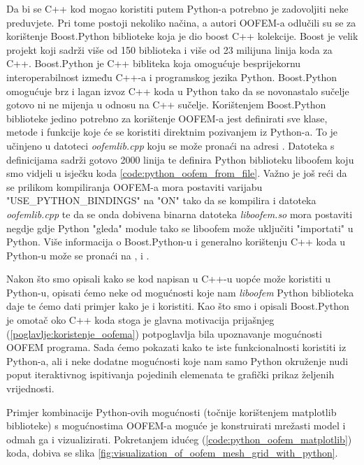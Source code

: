 \documentclass[a4paper,twoside,12pt]{memoir} %
\begin{document}
Da bi se C++ kod mogao koristiti putem Python-a potrebno je zadovoljiti neke preduvjete. Pri tome postoji nekoliko načina, a autori OOFEM-a odlučili su se za korištenje Boost.Python biblioteke koja je dio boost C++ kolekcije. Boost je velik projekt koji sadrži više od 150 biblioteka i više od 23 milijuna linija koda za C++. Boost.Python je C++ bibliteka koja omogućuje besprijekornu interoperabilnost između C++-a i programskog jezika Python. Boost.Python omogućuje brz i lagan izvoz C++ koda u Python tako da se novonastalo sučelje gotovo ni ne mijenja u odnosu na C++ sučelje. Korištenjem Boost.Python biblioteke jedino potrebno za korištenje OOFEM-a jest definirati sve klase, metode i funkcije koje će se koristiti direktnim pozivanjem iz Python-a. To je učinjeno u datoteci \textit{oofemlib.cpp} koju se može pronaći na adresi \cite{oofemlib_source}. Datoteka s definicijama sadrži gotovo 2000 linija te definira Python biblioteku liboofem koju smo vidjeli u isječku koda \ref{code:python_oofem_from_file}. Važno je još reći da se prilikom kompiliranja OOFEM-a mora postaviti varijabu "USE\_PYTHON\_BINDINGS" na "ON" tako da se kompilira i datoteka \textit{oofemlib.cpp} te da se onda dobivena binarna datoteka \textit{liboofem.so} mora postaviti negdje gdje Python "gleda" module tako se liboofem može uključiti "importati" u Python. Više informacija o Boost.Python-u i generalno korištenju C++ koda u Python-u može se pronaći na \cite{boost_python}, \cite{ctypes} i \cite{swig}. \par

Nakon što smo opisali kako se kod napisan u C++-u uopće može koristiti u Python-u, opisati ćemo neke od mogućnosti koje nam \textit{liboofem} Python biblioteka daje te ćemo dati primjer kako je i koristiti. Kao što smo i opisali Boost.Python je omotač oko C++ koda stoga je glavna motivacija prijašnjeg (\ref{poglavlje:koristenje_oofema}) potpoglavlja bila upoznavanje mogućnosti OOFEM programa. Sada ćemo pokazati kako te iste funkcionalnosti koristiti iz Python-a, ali i neke dodatne mogućnosti koje nam samo Python okruženje nudi poput iteraktivnog ispitivanja pojedinih elemenata te grafički prikaz željenih vrijednosti. \par

Primjer kombinacije Python-ovih mogućnosti (točnije korištenjem matplotlib biblioteke) s mogućnostima OOFEM-a moguće je konstruirati mrežasti model i odmah ga i vizualizirati. Pokretanjem idućeg (\ref{code:python_oofem_matplotlib}) koda, dobiva se slika \ref{fig:visualization_of_oofem_mesh_grid_with_python}.
\end{document}
